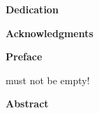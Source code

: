 
\ifx\Dedication\empty
\else
    \begingroup

    \centering
    \textbf{Dedication}

    \flushleft
    \Dedication

    \endgroup
    \clearpage
\fi


\ifx\Acknowledgements\empty
\else
    \begingroup

    \centering
    \textbf{Acknowledgments}

    \flushleft
    \Acknowledgements

    \endgroup
    \clearpage
\fi


\ifx\Preface\empty
\else
    \begingroup

    \centering
    \textbf{Preface}

    \flushleft
    \Preface

    \endgroup
    \clearpage
\fi


\ifx\Abstract\empty
    \errmessage \Abstract must not be empty!
\else
    \begingroup

    \centering
    \textbf{Abstract}

    \flushleft
    \Abstract

    \endgroup
    \clearpage
\fi


\tableofcontents

\listoffigures

\listoftables

\clearpage
